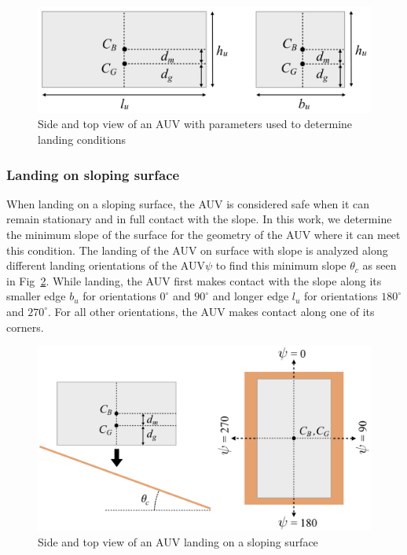 \begin{figure}[!ht]
\centering
\includegraphics[width=5.0in]{./images/mehul5.png}
\caption{Side and top view of an AUV with parameters used to determine landing conditions}
\label{f:mehul5}
\end{figure}


\subsubsection{Landing on sloping surface}

When landing on a sloping surface, the AUV is considered safe when it can remain stationary and in full contact with the slope. In this work, we determine the minimum slope of the surface for the geometry of the AUV where it can meet this condition. The landing of the AUV on surface with slope is analyzed along different landing orientations of the AUV$\psi$ to find this minimum slope  $\theta_c$ as seen in Fig~\ref{f:mehul6}. 
	While landing, the AUV first makes contact with the slope along its smaller 
	edge $b_u$ for orientations $0^\circ$ and $90^\circ$ and longer edge $l_u$ 
	for orientations $180^\circ$ and $270^\circ$. For all other orientations, 
	the AUV makes contact along one of its corners.

\begin{figure}[!ht]
\centering
\includegraphics[width=5in]{./images/mehul6.png}
\caption{Side and top view of an AUV landing on a sloping surface}
\label{f:mehul6}
\end{figure}


